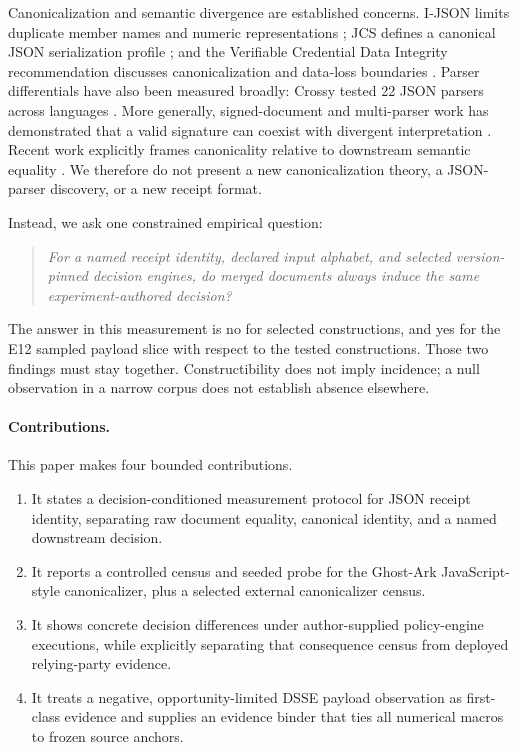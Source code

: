 \documentclass[10pt,twocolumn,letterpaper]{article}
\newcommand{\ghostark}{Ghost-Ark}
\begin{document}
Canonicalization and semantic divergence are established concerns.  I-JSON
limits duplicate member names and numeric representations
\cite{rfc7493}; JCS defines a canonical JSON serialization profile
\cite{rfc8785}; and the Verifiable Credential Data Integrity recommendation
discusses canonicalization and data-loss boundaries
\cite{w3c-vcdi-2025}.  Parser differentials have also been measured broadly:
Crossy tested 22 JSON parsers across languages \cite{moller2024cross}.
More generally, signed-document and multi-parser work has demonstrated that a
valid signature can coexist with divergent interpretation
\cite{rohlmann2023signature,you2025zip}.  Recent work explicitly frames
canonicality relative to downstream semantic equality
\cite{bromme2026canonicalization}.  We therefore do not present a new
canonicalization theory, a JSON-parser discovery, or a new receipt format.

Instead, we ask one constrained empirical question:

\begin{quote}
\emph{For a named receipt identity, declared input alphabet, and selected
version-pinned decision engines, do merged documents always induce the same
experiment-authored decision?}
\end{quote}

The answer in this measurement is no for selected constructions, and yes for
the E12 sampled payload slice with respect to the tested constructions.  Those
two findings must stay together.  Constructibility does not imply incidence;
a null observation in a narrow corpus does not establish absence elsewhere.

\paragraph{Contributions.}
This paper makes four bounded contributions.

\begin{enumerate}
  \item It states a decision-conditioned measurement protocol for JSON receipt
  identity, separating raw document equality, canonical identity, and a named
  downstream decision.
  \item It reports a controlled census and seeded probe for the \ghostark{}
  JavaScript-style canonicalizer, plus a selected external canonicalizer
  census.
  \item It shows concrete decision differences under author-supplied
  policy-engine executions, while explicitly separating that consequence
  census from deployed relying-party evidence.
  \item It treats a negative, opportunity-limited DSSE payload observation as
  first-class evidence and supplies an evidence binder that ties all numerical
  macros to frozen source anchors.
\end{enumerate}
\end{document}
